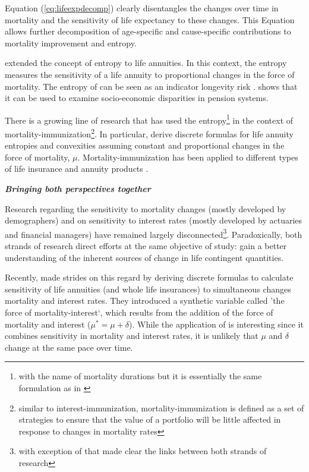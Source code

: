 \documentclass[12pt]{article}
\begin{document}
Equation (\ref{eq:lifeexpdecomp}) clearly disentangles the changes over time in mortality and the sensitivity of life expectancy to these changes. This Equation allows further decomposition of age-specific and cause-specific contributions to mortality improvement and entropy.

\citet{Haberman2011} extended the concept of entropy to life annuities. In this context, the entropy measures the sensitivity of a life annuity to proportional changes in the force of mortality. The entropy of can be seen as an indicator longevity risk \citep{rabitti2020mortality}. \citet{alvarez2021linking} shows that it can be used to examine socio-economic disparities in pension systems.

There is a growing line of research that has used the entropy\footnote{with the name of mortality durations but it is essentially the same formulation as in \citet{Haberman2011}} in the context of mortality-immunization\footnote{similar to interest-immunization, mortality-immunization is defined as a set of strategies to ensure that the value of a portfolio will be little affected in response to changes in mortality rates}. In particular, \citet{wang2010optimal,tsai2011actuarial,Tsai2013a,Li2011} derive discrete formulas for life annuity entropies and convexities assuming constant and proportional changes in the force of mortality, $\mu$. Mortality-immunization has been applied to different types of life insurance and annuity products \citep{li2012key,Li2012,Wong2015,Luciano2015,levantesi2018natural}. 

\textit{\textbf{Bringing both perspectives together}}

Research regarding the sensitivity to mortality changes (mostly developed by demographers) and on sensitivity to interest rates (mostly developed by actuaries and financial managers) have remained largely disconnected\footnote{with exception of \citet{Haberman2011,rabitti2020mortality,alvarez2021linking} that made clear the links between both strands of research}. Paradoxically, both strands of research direct efforts at the same objective of study: gain a better understanding of the inherent sources of change in life contingent quantities.

Recently, \citet{Lin2020} made strides on this regard by deriving discrete formulas to calculate sensitivity of life annuities (and whole life insurances) to simultaneous changes mortality and interest rates. They introduced a synthetic variable called 'the force of mortality-interest`, which results from the addition of the force of mortality and interest ($\mu^*=\mu+\delta$). While the application of \citet{Lin2020} is interesting since it combines sensitivity in mortality and interest rates, it is unlikely that $\mu$ and $\delta$ change at the same pace over time. 
\end{document}
